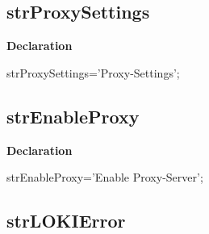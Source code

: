 \documentclass{report}
\newif\ifpdf
\begin{document}
\subsection*{strProxySettings}
\fi
\label{trstrings-strProxySettings}
\begin{list}{}{
\setlength{\itemindent}{0cm}
\setlength{\listparindent}{0cm}
\setlength{\leftmargin}{\evensidemargin}
\addtolength{\leftmargin}{\tmplength}
\settowidth{\labelsep}{X}
\addtolength{\leftmargin}{\labelsep}
\setlength{\labelwidth}{\tmplength}
}
\item[\textbf{Declaration}\hfill]
\ifpdf
\begin{flushleft}
\fi
\begin{ttfamily}
strProxySettings='Proxy-Settings';\end{ttfamily}

\ifpdf
\end{flushleft}
\fi

\end{list}
\ifpdf
\subsection*{\large{\textbf{strEnableProxy}}\normalsize\hspace{1ex}\hrulefill}
\else
\subsection*{strEnableProxy}
\fi
\label{trstrings-strEnableProxy}
\begin{list}{}{
\setlength{\itemindent}{0cm}
\setlength{\listparindent}{0cm}
\setlength{\leftmargin}{\evensidemargin}
\addtolength{\leftmargin}{\tmplength}
\settowidth{\labelsep}{X}
\addtolength{\leftmargin}{\labelsep}
\setlength{\labelwidth}{\tmplength}
}
\item[\textbf{Declaration}\hfill]
\ifpdf
\begin{flushleft}
\fi
\begin{ttfamily}
strEnableProxy='Enable Proxy-Server';\end{ttfamily}

\ifpdf
\end{flushleft}
\fi

\end{list}
\ifpdf
\subsection*{\large{\textbf{strLOKIError}}\normalsize\hspace{1ex}\hrulefill}
\else
\end{document}
